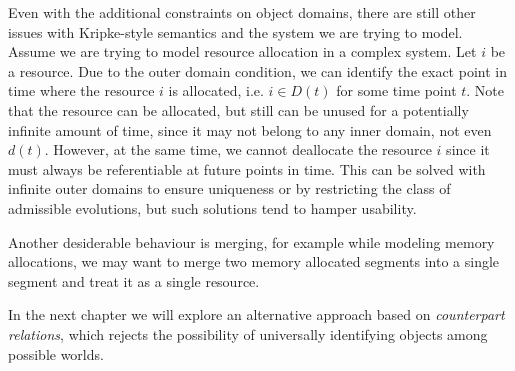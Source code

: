 Even with the additional constraints on object domains, there are still other issues with Kripke-style semantics and the
system we are trying to model. Assume we are trying to model resource allocation in a complex system. Let $i$ be a
resource. Due to the outer domain condition, we can identify the exact point in time where the resource $i$ is
allocated, i.e. $i \in D(t)$ for some time point $t$. Note that the resource can be allocated, but still can be unused
for a potentially infinite amount of time, since it may not belong to any inner domain, not even $d(t)$. However, at the
same time, we cannot deallocate the resource $i$ since it must always be referentiable at future points in time. This
can be solved with infinite outer domains to ensure uniqueness or by restricting the class of admissible evolutions, but
such solutions tend to hamper usability.

Another desiderable behaviour is merging, for example while modeling memory allocations, we may want to merge two memory
allocated segments into a single segment and treat it as a single resource.

In the next chapter we will explore an alternative approach based on \emph{counterpart relations}, which rejects the
possibility of universally identifying objects among possible worlds.
